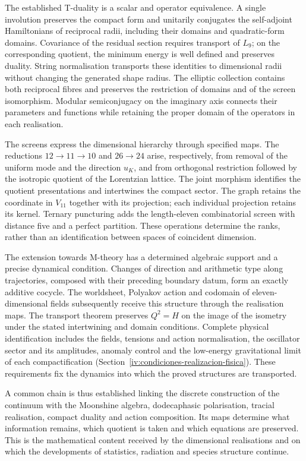 The established T-duality is a scalar and operator equivalence.
A single involution preserves the compact form and unitarily conjugates
the self-adjoint Hamiltonians of reciprocal radii, including their
domains and quadratic-form domains. Covariance of the residual section
requires transport of \(L_9\); on the corresponding quotient, the
minimum energy is well defined and preserves duality. String
normalisation transports these identities to dimensional radii without
changing the generated shape radius. The elliptic collection contains both
reciprocal fibres and preserves the restriction of domains and of the
screen isomorphism. Modular semiconjugacy on the imaginary axis connects
their parameters and functions while retaining the proper domain of
the operators in each realisation.

The screens express the dimensional hierarchy through specified maps.
The reductions \(12\to11\to10\) and \(26\to24\) arise, respectively,
from removal of the uniform mode and the direction \(u_K\), and from
orthogonal restriction followed by the isotropic quotient of the
Lorentzian lattice. The joint morphism identifies the quotient
presentations and intertwines the compact sector. The graph retains
the coordinate in \(V_{11}\) together with its projection; each
individual projection retains its kernel. Ternary puncturing adds
the length-eleven combinatorial screen with distance five and a perfect
partition. These operations determine the ranks, rather than an
identification between spaces of coincident dimension.

The extension towards M-theory has a determined algebraic support
and a precise dynamical condition. Changes of direction and arithmetic
type along trajectories, composed with their preceding boundary datum,
form an exactly additive cocycle. The worldsheet, Polyakov action and
codomain of eleven-dimensional fields subsequently receive this
structure through the realisation maps. The transport theorem preserves
\(Q^2=H\) on the image of the isometry under the stated intertwining
and domain conditions. Complete physical identification includes the
fields, tensions and action normalisation, the oscillator sector and
its amplitudes, anomaly control and the low-energy gravitational limit
of each compactification
(Section~\ref{iv:condiciones-realizacion-fisica}).
These requirements fix the dynamics into which the proved structures
are transported.

A common chain is thus established linking the discrete construction
of the continuum with the Moonshine algebra, dodecaphasic polarisation,
tracial realisation, compact duality and action composition.
Its maps determine what information remains, which quotient is taken
and which equations are preserved. This is the mathematical content
received by the dimensional realisations and on which the developments
of statistics, radiation and species structure continue.

\par\endgroup
